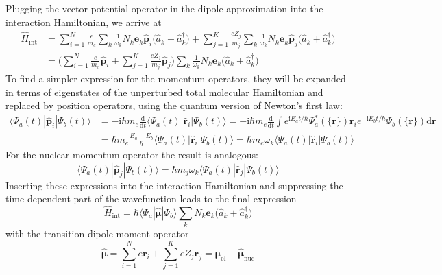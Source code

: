 \documentclass[9pt]{report}
\begin{document}
Plugging the vector potential operator in the dipole approximation into the interaction Hamiltonian, we arrive at
\begin{align}
\hat{H}_{\mathrm{int}} &= \sum_{i=1}^{N}\frac{e}{m_e}\sum_{k}\frac{1}{\omega_k}N_{k}\boldsymbol{e}_{k}\hat{\boldsymbol{p}}_{i}\big(\hat{a}_{k}+\hat{a}_{k}^{\dagger}\big) + \sum_{j=1}^{K}\frac{eZ_{j}}{m_{j}}\sum_{k}\frac{1}{\omega_k}N_{k}\boldsymbol{e}_{k}\hat{\boldsymbol{p}}_{j}\big(\hat{a}_{k}+\hat{a}_{k}^{\dagger}\big)\\
&= \bigg(\sum_{i=1}^{N}\frac{e}{m_e}\hat{\boldsymbol{p}}_{i}+\sum_{j=1}^{K}\frac{eZ_{j}}{m_{j}}\hat{\boldsymbol{p}}_{j}\bigg)\sum_{k}\frac{1}{\omega_k}N_{k}\boldsymbol{e}_{k}\big(\hat{a}_{k}+\hat{a}_{k}^{\dagger}\big)
\end{align}
To find a simpler expression for the momentum operators, they will be expanded in terms of eigenstates of the unperturbed total molecular Hamiltonian and replaced by position operators, using the quantum version of Newton's first law:
\begin{align}
\langle\Psi_{a}(t)|\hat{\boldsymbol{p}}_{i}|\Psi_{b}(t)\rangle &= -\mathrm{i}\hbar m_e\frac{\mathrm{d}}{\mathrm{d}t}\langle\Psi_{a}(t)|\hat{\boldsymbol{r}}_{i}|\Psi_{b}(t)\rangle = -\mathrm{i}\hbar m_e\frac{\mathrm{d}}{\mathrm{d}t}\int e^{\mathrm{i}E_{a}t/\hbar}\Psi_{a}^{*}(\{\boldsymbol{r}\})\boldsymbol{r}_{i}e^{-\mathrm{i}E_{b}t/\hbar}\Psi_{b}(\{\boldsymbol{r}\})\mathrm{d}\boldsymbol{r}\\
&= \hbar m_{e}\frac{E_{a}-E_{b}}{\hbar}\langle\Psi_{a}(t)|\hat{\boldsymbol{r}}_{i}|\Psi_{b}(t)\rangle = \hbar m_{e}\omega_{k}\langle\Psi_{a}(t)|\hat{\boldsymbol{r}}_{i}|\Psi_{b}(t)\rangle
\end{align}
For the nuclear momentum operator the result is analogous:
\begin{equation}
\langle\Psi_{a}(t)|\hat{\boldsymbol{p}}_{j}|\Psi_{b}(t)\rangle = \hbar m_{j}\omega_{k}\langle\Psi_{a}(t)|\hat{\boldsymbol{r}}_{j}|\Psi_{b}(t)\rangle
\end{equation}
Inserting these expressions into the interaction Hamiltonian and suppressing the time-dependent part of the wavefunction leads to the final expression
\begin{equation}
\hat{H}_{\mathrm{int}} = \hbar\langle\Psi_{a}|\hat{\boldsymbol{\mu}}|\Psi_{b}\rangle\sum_{k}N_{k}\boldsymbol{e}_{k}\big(\hat{a}_{k}+\hat{a}_{k}^{\dagger}\big)
\end{equation}
with the transition dipole moment operator
\begin{equation}
\hat{\boldsymbol{\mu}} = \sum_{i=1}^{N}e\boldsymbol{r}_{i}+\sum_{j=1}^{K}eZ_{j}\boldsymbol{r}_{j} = \hat{\boldsymbol{\mu}}_{\mathrm{el}}+\hat{\boldsymbol{\mu}}_{\mathrm{nuc}}
\end{equation}
\end{document}
